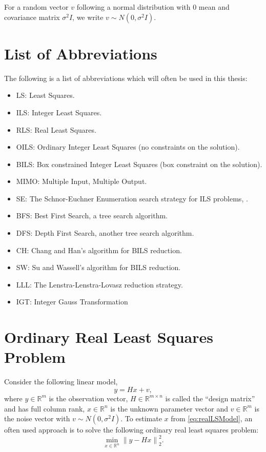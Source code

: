 \documentclass[12pt,Bold,letterpaper]{mcgilletdclass}
\newcommand{\be}{\begin{equation}}
\newcommand{\ee}{\end{equation}}
\begin{document}
For a random vector $v$ following a normal distribution with $0$ mean and covariance matrix $\sigma^2I$, we write $v \sim N(0,\sigma^2I)$.

\section{List of Abbreviations}

The following is a list of abbreviations which will often be used in this thesis:
\begin{itemize}
\item LS: Least Squares.
\item ILS: Integer Least Squares.
\item RLS: Real Least Squares.
\item OILS: Ordinary Integer Least Squares (no constraints on the solution).
\item BILS: Box constrained Integer Least Squares (box constraint on the solution).
\item MIMO: Multiple Input, Multiple Output.
\item SE: The Schnor-Euchner Enumeration search strategy for ILS problems, \cite{SchE94}.
\item BFS: Best First Search, a tree search algorithm.
\item DFS: Depth First Search, another tree search algorithm.
\item CH: Chang and Han's algorithm for BILS reduction.
\item SW: Su and Wassell's algorithm for BILS reduction.
\item LLL: The Lenstra-Lenstra-Lovasz reduction strategy.
\item IGT: Integer Gauss Transformation
\end{itemize}

\section{Ordinary Real Least Squares Problem}
Consider the following linear model,
\begin{equation}
\label{eq:realLSModel}
y = Hx+v,
\end{equation}
where $y\in\mathbb{R}^m$ is the observation vector, $H\in\mathbb{R}^{m \times n}$ is called the
``design matrix'' and has full column rank, $x \in \mathbb{R}^n$ is the unknown parameter vector and $v \in \mathbb{R}^m$ is the noise vector with $v \sim N(0,\sigma^2I)$. To estimate $x$ from \eqref{eq:realLSModel}, an often used approach is to solve the following ordinary real least squares problem:
\be
\label{eq:realLSResidual}
	\min_{x \in \mathbb{R}^n} \left \| y- Hx \right \|^2_2.
\ee
\end{document}
